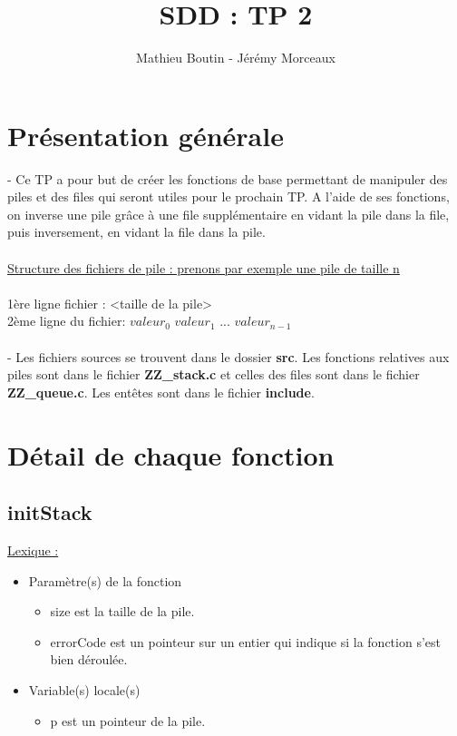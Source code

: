 \documentclass[a4paper]{article}
\title{SDD : TP 2}
\author{Mathieu Boutin - Jérémy Morceaux}
\begin{document}
\maketitle
\section{Présentation générale}
- Ce TP a pour but de créer les fonctions de base permettant de manipuler des piles et des files qui seront utiles pour le prochain TP. A l'aide de ses fonctions, on inverse une pile grâce à une file supplémentaire en vidant la pile dans la file, puis inversement, en vidant la file dans la pile.
\\
\\
\underline{Structure des fichiers de pile : prenons par exemple une pile de taille n}
\\
\\
1ère ligne fichier : <taille de la pile>
\\
2ème ligne du fichier: $valeur_{0}$ $valeur_{1}$  ... $valeur_{n-1}$
\\
\\
- Les fichiers sources se trouvent dans le dossier \textbf{src}. Les fonctions relatives aux piles sont dans le fichier \textbf{ZZ\_stack.c} et celles des files sont dans le fichier \textbf{ZZ\_queue.c}. Les entêtes sont dans le fichier \textbf{include}.

\section{Détail de chaque fonction}

\subsection{initStack}
\underline{Lexique :}

\begin{itemize}

\item Paramètre(s) de la fonction  

\begin{itemize}

\item size est la taille de la pile.

\item errorCode est un pointeur sur un entier qui indique si la fonction s'est bien déroulée.

\end{itemize}

\item Variable(s) locale(s)

\begin{itemize}

\item p est un pointeur de la pile.
\end{itemize}

\end{itemize}
\end{document}
